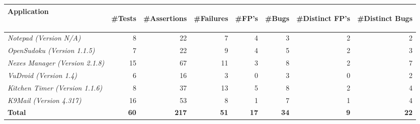 \begin{table}[t!]
\vspace*{-3ex}
\centering
{}
\label{table:bugsFound}
{
\begin{tabular}{lrrrrrrr}
\toprule
\bf{Application}&\begin{sideways}\bf{\#Tests}\end{sideways}&\begin{sideways}\bf{\#Assertions}\end{sideways}&\begin{sideways}\bf{\#Failures}\end{sideways}&\begin{sideways}\bf{\#FP's}\end{sideways}&\begin{sideways}\bf{\#Bugs}\end{sideways}&\begin{sideways}\bf{\#Distinct FP's}\end{sideways}&\begin{sideways}\bf{\#Distinct Bugs}\end{sideways}\\
\midrule
\textit{Notepad (Version N/A)}&8&22&7&4&3&2&2\\
\textit{OpenSudoku (Version 1.1.5)}&7&22&9&4&5&2&3\\
\textit{Nexes Manager (Version 2.1.8)}&15&67&11&3&8&2&7\\
\midrule
\textit{VuDroid (Version 1.4)}&6&16&3&0&3&0&2\\
\textit{Kitchen Timer (Version 1.1.6)}&8&37&13&5&8&2&4\\
\textit{K9Mail (Version 4.317)}&16&53&8&1&7&1&4\\
\midrule
\bf{Total}&\bf 60&\bf 217&\bf 51&\bf 17&\bf 34&\bf 9&\bf 22\\
\bottomrule
\end{tabular}
}
\end{table}
